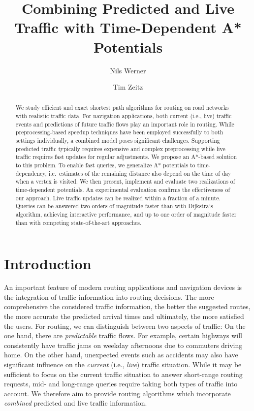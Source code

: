 \documentclass[a4paper,UKenglish,cleveref, autoref, thm-restate,anonymous]{lipics-v2021}
\title{Combining Predicted and Live Traffic with Time-Dependent A* Potentials}
\author{Nils Werner}{Karlsruhe Institute of Technology, Germany}{}{}{}
\author{Tim Zeitz}{Karlsruhe Institute of Technology, Germany}{tim.zeitz@kit.edu}{https://orcid.org/0000-0003-4746-3582}{}
\begin{document}
\maketitle

\begin{abstract}
We study efficient and exact shortest path algorithms for routing on road networks with realistic traffic data.
For navigation applications, both current (i.e., live) traffic events and predictions of future traffic flows play an important role in routing.
While preprocessing-based speedup techniques have been employed successfully to both settings individually, a combined model poses significant challenges.
Supporting predicted traffic typically requires expensive and complex preprocessing while live traffic requires fast updates for regular adjustments.
We propose an A*-based solution to this problem.
To enable fast queries, we generalize A* potentials to time-dependency, i.e.\ estimates of the remaining distance also depend on the time of day when a vertex is visited.
We then present, implement and evaluate two realizations of time-dependent potentials.
An experimental evaluation confirms the effectiveness of our approach.
Live traffic updates can be realized within a fraction of a minute.
Queries can be answered two orders of magnitude faster than with Dijkstra's algorithm, achieving interactive performance, and up to one order of magnitude faster than with competing state-of-the-art approaches.
\end{abstract}

\section{Introduction}

An important feature of modern routing applications and navigation devices is the integration of traffic information into routing decisions.
The more comprehensive the considered traffic information, the better the suggested routes, the more accurate the predicted arrival times and ultimately, the more satisfied the users.
For routing, we can distinguish between two aspects of traffic:
On the one hand, there are \emph{predictable} traffic flows.
For example, certain highways will consistently have traffic jams on weekday afternoons due to commuters driving home.
On the other hand, unexpected events such as accidents may also have significant influence on the \emph{current} (i.e., \emph{live}) traffic situation.
While it may be sufficient to focus on the current traffic situation to answer short-range routing requests, mid- and long-range queries require taking both types of traffic into account.
We therefore aim to provide routing algorithms which incorporate \emph{combined} predicted and live traffic information.
\end{document}
